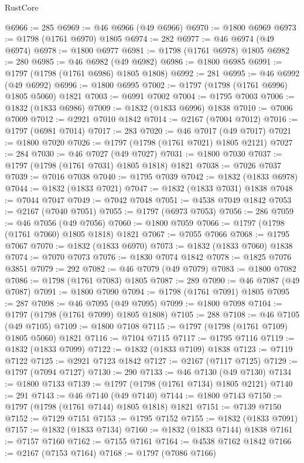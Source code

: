 \begin{lexlean}{RustCore}
\begin{coremodule}
@6966 := 285
@6969 := @46 @6966 (@49 @6966)
@6970 := @1800 @6969
@6973 := @1798 (@1761 @6970) @1805
@6974 := 282
@6977 := @46 @6974 (@49 @6974)
@6978 := @1800 @6977
@6981 := @1798 (@1761 @6978) @1805
@6982 := 280
@6985 := @46 @6982 (@49 @6982)
@6986 := @1800 @6985
@6991 := @1797 (@1798 (@1761 @6986) @1805 @1808)
@6992 := 281
@6995 := @46 @6992 (@49 @6992)
@6996 := @1800 @6995
@7002 := @1797 (@1798 (@1761 @6996) @1805 @5060) @1821
@7003 := @6991 @7002
@7004 := @1795 @7003
@7006 := @1832 (@1833 @6986)
@7009 := @1832 (@1833 @6996) @1838
@7010 := @7006 @7009
@7012 := @2921 @7010 @1842
@7014 := @2167 (@7004 @7012)
@7016 := @1797 (@6981 @7014)
@7017 := 283
@7020 := @46 @7017 (@49 @7017)
@7021 := @1800 @7020
@7026 := @1797 (@1798 (@1761 @7021) @1805 @2121)
@7027 := 284
@7030 := @46 @7027 (@49 @7027)
@7031 := @1800 @7030
@7037 := @1797 (@1798 (@1761 @7031) @1805 @1818) @1821
@7038 := @7026 @7037
@7039 := @7016 @7038
@7040 := @1795 @7039
@7042 := @1832 (@1833 @6978)
@7044 := @1832 (@1833 @7021)
@7047 := @1832 (@1833 @7031) @1838
@7048 := @7044 @7047
@7049 := @7042 @7048
@7051 := @4538 @7049 @1842
@7053 := @2167 (@7040 @7051)
@7055 := @1797 (@6973 @7053)
@7056 := 286
@7059 := @46 @7056 (@49 @7056)
@7060 := @1800 @7059
@7066 := @1797 (@1798 (@1761 @7060) @1805 @1818) @1821
@7067 := @7055 @7066
@7068 := @1795 @7067
@7070 := @1832 (@1833 @6970)
@7073 := @1832 (@1833 @7060) @1838
@7074 := @7070 @7073
@7076 := @1830 @7074 @1842
@7078 := @1825 @7076 @3851
@7079 := 292
@7082 := @46 @7079 (@49 @7079)
@7083 := @1800 @7082
@7086 := @1798 (@1761 @7083) @1805
@7087 := 289
@7090 := @46 @7087 (@49 @7087)
@7091 := @1800 @7090
@7094 := @1798 (@1761 @7091) @1805
@7095 := 287
@7098 := @46 @7095 (@49 @7095)
@7099 := @1800 @7098
@7104 := @1797 (@1798 (@1761 @7099) @1805 @1808)
@7105 := 288
@7108 := @46 @7105 (@49 @7105)
@7109 := @1800 @7108
@7115 := @1797 (@1798 (@1761 @7109) @1805 @5060) @1821
@7116 := @7104 @7115
@7117 := @1795 @7116
@7119 := @1832 (@1833 @7099)
@7122 := @1832 (@1833 @7109) @1838
@7123 := @7119 @7122
@7125 := @2921 @7123 @1842
@7127 := @2167 (@7117 @7125)
@7129 := @1797 (@7094 @7127)
@7130 := 290
@7133 := @46 @7130 (@49 @7130)
@7134 := @1800 @7133
@7139 := @1797 (@1798 (@1761 @7134) @1805 @2121)
@7140 := 291
@7143 := @46 @7140 (@49 @7140)
@7144 := @1800 @7143
@7150 := @1797 (@1798 (@1761 @7144) @1805 @1818) @1821
@7151 := @7139 @7150
@7152 := @7129 @7151
@7153 := @1795 @7152
@7155 := @1832 (@1833 @7091)
@7157 := @1832 (@1833 @7134)
@7160 := @1832 (@1833 @7144) @1838
@7161 := @7157 @7160
@7162 := @7155 @7161
@7164 := @4538 @7162 @1842
@7166 := @2167 (@7153 @7164)
@7168 := @1797 (@7086 @7166)

\end{coremodule}
\end{lexlean}
